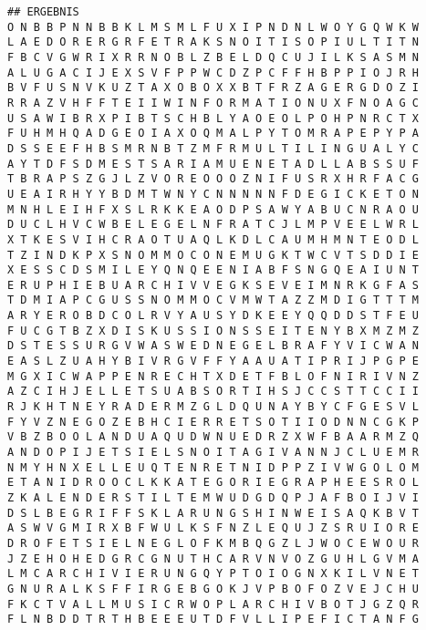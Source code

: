 \documentclass[a4paper,10pt,ngerman]{scrartcl}
\begin{document}
\begin{lstlisting}
## ERGEBNIS
O N B B P N N B B K L M S M L F U X I P N D N L W O Y G Q W K W
L A E D O R E R G R F E T R A K S N O I T I S O P I U L T I T N
F B C V G W R I X R R N O B L Z B E L D Q C U J I L K S A S M N
A L U G A C I J E X S V F P P W C D Z P C F F H B P P I O J R H
B V F U S N V K U Z T A X O B O X X B T F R Z A G E R G D O Z I
R R A Z V H F F T E I I W I N F O R M A T I O N U X F N O A G C
U S A W I B R X P I B T S C H B L Y A O E O L P O H P N R C T X
F U H M H Q A D G E O I A X O Q M A L P Y T O M R A P E P Y P A
D S S E E F H B S M R N B T Z M F R M U L T I L I N G U A L Y C
A Y T D F S D M E S T S A R I A M U E N E T A D L L A B S S U F
T B R A P S Z G J L Z V O R E O O O Z N I F U S R X H R F A C G
U E A I R H Y Y B D M T W N Y C N N N N N F D E G I C K E T O N
M N H L E I H F X S L R K K E A O D P S A W Y A B U C N R A O U
D U C L H V C W B E L E G E L N F R A T C J L M P V E E L W R L
X T K E S V I H C R A O T U A Q L K D L C A U M H M N T E O D L
T Z I N D K P X S N O M M O C O N E M U G K T W C V T S D D I E
X E S S C D S M I L E Y Q N Q E E N I A B F S N G Q E A I U N T
E R U P H I E B U A R C H I V V E G K S E V E I M N R K G F A S
T D M I A P C G U S S N O M M O C V M W T A Z Z M D I G T T T M
A R Y E R O B D C O L R V Y A U S Y D K E E Y Q Q D D S T F E U
F U C G T B Z X D I S K U S S I O N S S E I T E N Y B X M Z M Z
D S T E S S U R G V W A S W E D N E G E L B R A F Y V I C W A N
E A S L Z U A H Y B I V R G V F F Y A A U A T I P R I J P G P E
M G X I C W A P P E N R E C H T X D E T F B L O F N I R I V N Z
A Z C I H J E L L E T S U A B S O R T I H S J C C S T T C C I I
R J K H T N E Y R A D E R M Z G L D Q U N A Y B Y C F G E S V L
F Y V Z N E G O Z E B H C I E R R E T S O T I I O D N N C G K P
V B Z B O O L A N D U A Q U D W N U E D R Z X W F B A A R M Z Q
A N D O P I J E T S I E L S N O I T A G I V A N N J C L U E M R
N M Y H N X E L L E U Q T E N R E T N I D P P Z I V W G O L O M
E T A N I D R O O C L K K A T E G O R I E G R A P H E E S R O L
Z K A L E N D E R S T I L T E M W U D G D Q P J A F B O I J V I
D S L B E G R I F F S K L A R U N G S H I N W E I S A Q K B V T
A S W V G M I R X B F W U L K S F N Z L E Q U J Z S R U I O R E
D R O F E T S I E L N E G L O F K M B Q G Z L J W O C E W O U R
J Z E H O H E D G R C G N U T H C A R V N V O Z G U H L G V M A
L M C A R C H I V I E R U N G Q Y P T O I O G N X K I L V N E T
G N U R A L K S F F I R G E B G O K J V P B O F O Z V E J C H U
F K C T V A L L M U S I C R W O P L A R C H I V B O T J G Z Q R
F L N B D D T R T H B E E E U T D F V L L I P E F I C T A N F G

\end{lstlisting}
\end{document}
